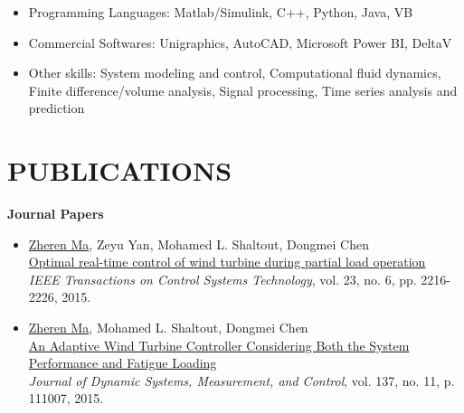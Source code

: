 \documentclass[margin, 9pt]{res} %
\begin{document}
\begin{resume}
\vspace*{-5pt}
\begin{itemize}[leftmargin=*] \itemsep -4pt
	\item Programming Languages: Matlab/Simulink, C++, Python, Java, VB
	\item Commercial Softwares: Unigraphics, AutoCAD, Microsoft Power BI, DeltaV
	\item Other skills: System modeling and control, Computational fluid dynamics, Finite difference/volume analysis, Signal processing, Time series analysis and prediction
\end{itemize}


\section{PUBLICATIONS}

{\large\textbf{Journal Papers}}
\begin{itemize}[leftmargin=*] \itemsep 0pt
	\item \underline{Zheren Ma}, Zeyu Yan, Mohamed L. Shaltout, Dongmei Chen\\
          \href{http://ieeexplore.ieee.org/xpl/login.jsp?tp=&arnumber=7065260&url=http\%3A\%2F\%2Fieeexplore.ieee.org\%2Fxpls\%2Fabs_all.jsp\%3Farnumber\%3D7065260}
          {Optimal real-time control of wind turbine during partial load operation}\\
          \textit{IEEE Transactions on Control Systems Technology}, vol. 23, no. 6, pp. 2216-2226, 2015.

\item \underline{Zheren Ma}, Mohamed L. Shaltout, Dongmei Chen\\
          \href{http://dynamicsystems.asmedigitalcollection.asme.org/article.aspx?articleid=2468735}
          {An Adaptive Wind Turbine Controller Considering Both the System Performance and Fatigue Loading}\\
          \textit{Journal of Dynamic Systems, Measurement, and Control}, vol. 137, no. 11, p. 111007, 2015.


\end{itemize}
\end{resume}
\end{document}
